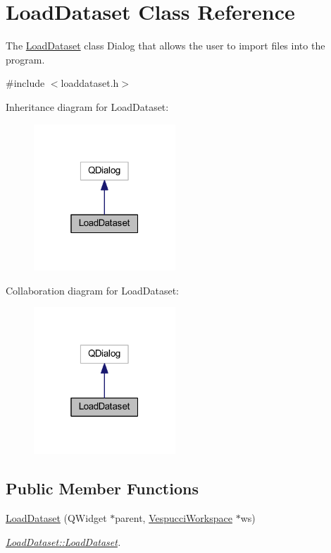 \hypertarget{class_load_dataset}{\section{Load\+Dataset Class Reference}
\label{class_load_dataset}
}


The \hyperlink{class_load_dataset}{Load\+Dataset} class Dialog that allows the user to import files into the program.  




{\ttfamily \#include $<$loaddataset.\+h$>$}



Inheritance diagram for Load\+Dataset\+:\nopagebreak
\begin{figure}[H]
\begin{center}
\leavevmode
\includegraphics[width=151pt]{class_load_dataset__inherit__graph}
\end{center}
\end{figure}


Collaboration diagram for Load\+Dataset\+:\nopagebreak
\begin{figure}[H]
\begin{center}
\leavevmode
\includegraphics[width=151pt]{class_load_dataset__coll__graph}
\end{center}
\end{figure}
\subsection*{Public Member Functions}
\begin{DoxyCompactItemize}
\item 
\hyperlink{class_load_dataset_a23139475dbcb8e5d44ba83fe46621334}{Load\+Dataset} (Q\+Widget $\ast$parent, \hyperlink{class_vespucci_workspace}{Vespucci\+Workspace} $\ast$ws)
\begin{DoxyCompactList}\small\item\em \hyperlink{class_load_dataset_a23139475dbcb8e5d44ba83fe46621334}{Load\+Dataset\+::\+Load\+Dataset}. \end{DoxyCompactList}\end{DoxyCompactItemize}


